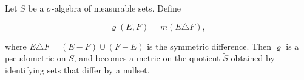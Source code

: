 Let $S$ be a $\sigma$-algebra of measurable sets. Define

$$\varrho(E, F) = m(E \triangle F),$$

where $E \triangle F = (E - F) \cup (F - E)$ is the symmetric difference. Then $\varrho$ is a pseudometric on $S$, and becomes a metric on the quotient $\tilde{S}$ obtained by identifying sets that differ by a nullset.
